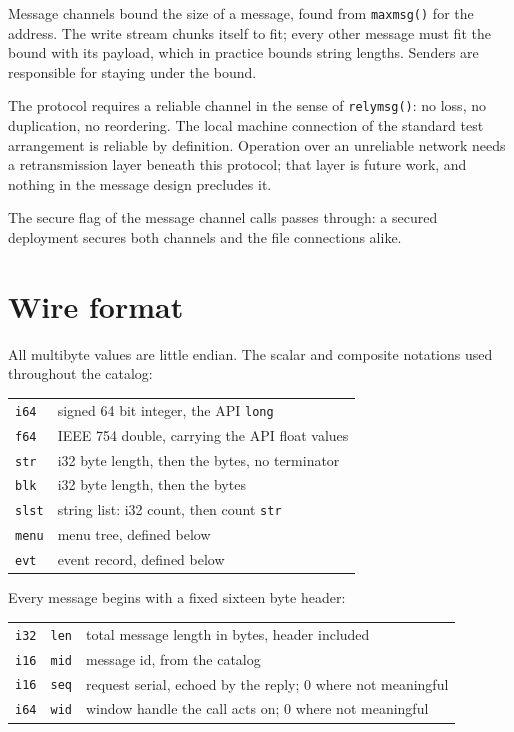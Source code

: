 \documentclass[11pt]{article}
\begin{document}
Message channels bound the size of a message, found from \texttt{maxmsg()}
for the address. The write stream chunks itself to fit; every other message
must fit the bound with its payload, which in practice bounds string
lengths. Senders are responsible for staying under the bound.

The protocol requires a reliable channel in the sense of
\texttt{relymsg()}: no loss, no duplication, no reordering. The local
machine connection of the standard test arrangement is reliable by
definition. Operation over an unreliable network needs a retransmission
layer beneath this protocol; that layer is future work, and nothing in the
message design precludes it.

The secure flag of the message channel calls passes through: a secured
deployment secures both channels and the file connections alike.

\section{Wire format}

All multibyte values are little endian. The scalar and composite notations
used throughout the catalog:

\begin{center}
\begin{tabular}{ll}
\texttt{i64} & signed 64 bit integer, the API \texttt{long} \\
\texttt{f64} & IEEE 754 double, carrying the API float values \\
\texttt{str} & i32 byte length, then the bytes, no terminator \\
\texttt{blk} & i32 byte length, then the bytes \\
\texttt{slst} & string list: i32 count, then count \texttt{str} \\
\texttt{menu} & menu tree, defined below \\
\texttt{evt} & event record, defined below \\
\end{tabular}
\end{center}

Every message begins with a fixed sixteen byte header:

\begin{center}
\begin{tabular}{lll}
\texttt{i32} & \texttt{len} & total message length in bytes, header
included \\
\texttt{i16} & \texttt{mid} & message id, from the catalog \\
\texttt{i16} & \texttt{seq} & request serial, echoed by the reply; 0 where
not meaningful \\
\texttt{i64} & \texttt{wid} & window handle the call acts on; 0 where not
meaningful \\
\end{tabular}
\end{center}
\end{document}
